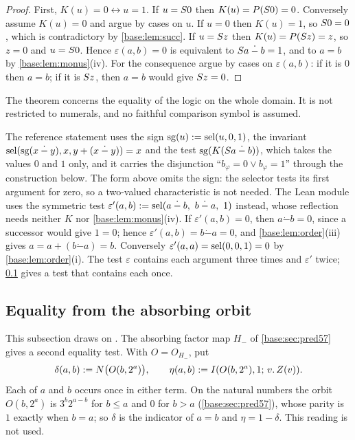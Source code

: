 \begin{proof}
First, $K(u)=0\leftrightarrow u=1$.  If $u=S 0$ then
$K(u)=P(S 0)=0$.  Conversely assume $K(u)=0$ and argue by cases on $u$.
If $u=0$ then $K(u)=1$, so $S 0=0$, which is contradictory by
\cref{base:lem:succ}.  If $u=S z$ then $K(u)=P(S z)=z$, so $z=0$ and
$u=S 0$.  Hence $\varepsilon(a,b)=0$ is equivalent to
$S a\mathbin{\dot-}b=1$, and to $a=b$ by \cref{base:lem:monus}(iv).  For
the consequence argue by cases on $\varepsilon(a,b)$: if it is $0$ then
$a=b$; if it is $S z$, then $a=b$ would give $S z=0$.
\end{proof}

The theorem concerns the equality of the logic on the whole domain.  It is
not restricted to numerals, and no faithful comparison symbol is assumed.

\begin{remark}[Variants]
\label{base:rem:reflectvariants}
The reference statement uses the sign $\operatorname{sg}(u)\mathrel{:=}\operatorname{sel}(u,0,1)$,
the invariant
$\operatorname{sel}(\operatorname{sg}(x\mathbin{\dot-}y),x,y+(x\mathbin{\dot-}y))=x$ and
the test $\operatorname{sg}(K(S a\mathbin{\dot-}b))$, which takes the
values $0$ and $1$ only, and it carries the disjunction
``$b_\varphi=0\vee b_\varphi=1$'' through the construction below.  The form
above omits the sign: the selector tests its first argument for zero, so a
two-valued characteristic is not needed.  The Lean module 
uses the symmetric test
$\varepsilon'(a,b)\defeq\sel(a\mathbin{\dot-}b,\ b\mathbin{\dot-}a,\ 1)$
instead, whose reflection needs neither $K$ nor \cref{base:lem:monus}(iv).  If
$\varepsilon'(a,b)=0$, then $a\mathbin{\dot-}b=0$, since a successor would
give $1=0$; hence $\varepsilon'(a,b)=b\mathbin{\dot-}a=0$, and
\cref{base:lem:order}(iii) gives $a=a+(b\mathbin{\dot-}a)=b$.  Conversely
$\varepsilon'(a,a)=\operatorname{sel}(0,0,1)=0$ by \cref{base:lem:order}(i).  The
test $\varepsilon$ contains each argument three times and $\varepsilon'$
twice; \cref{base:sec:orbiteq} gives a test that contains each once.
\end{remark}

\subsection{Equality from the absorbing orbit}
\label{base:sec:orbiteq}

This subsection draws on .  The absorbing factor map
$H_-$ of \cref{base:sec:pred57} gives a second equality test.  With
$O=O_{H_-}$, put
\[
 \delta(a,b)\mathrel{:=} N\bigl(O(b,2^{a})\bigr),\qquad
 \eta(a,b)\mathrel{:=}I(O(b,2^{a}),1;\,v.\,Z(v)) .
\]
Each of $a$ and $b$ occurs once in either term.  On the natural numbers the
orbit $O(b,2^{a})$ is $3^{b}2^{a-b}$ for $b\le a$ and $0$ for $b>a$
(\cref{base:sec:pred57}), whose parity is $1$ exactly when $b=a$; so
$\delta$ is the indicator of $a=b$ and $\eta=1-\delta$.  This reading is not
used.

